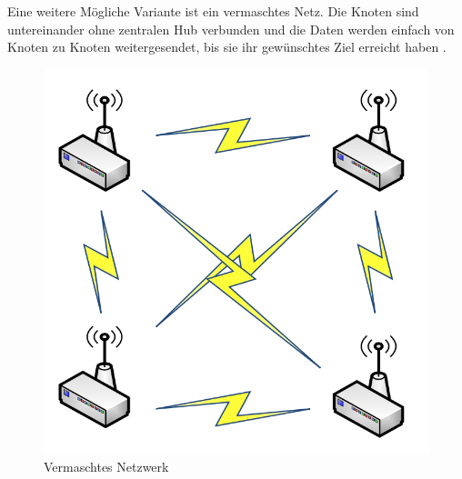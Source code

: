 Eine weitere Mögliche Variante ist ein vermaschtes Netz. Die Knoten sind untereinander ohne zentralen Hub verbunden und die Daten werden einfach von Knoten zu Knoten weitergesendet, bis sie ihr gewünschtes Ziel erreicht haben \cite{d:kosmerchock}. 

\begin{figure}[H] 
	\centering
	\includegraphics[scale=0.5]{Bilder/mesh}
	\caption{Vermaschtes Netzwerk\cite{d:kosmerchock}}
	\label{f:mesh}
\end{figure}